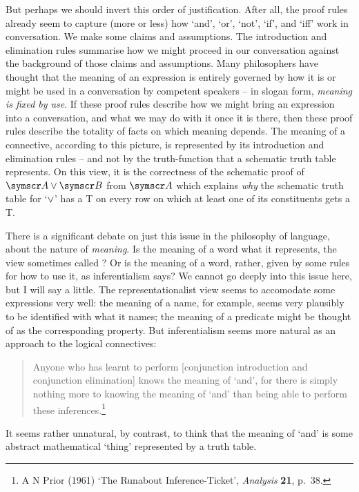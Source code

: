 But perhaps we should invert this order of justification. After all, the proof rules already seem to capture (more or less) how `and', `or', `not', `if', and `iff' work in conversation. We make some claims and assumptions. The introduction and elimination rules summarise how we might proceed in our conversation against the background of those claims and assumptions. Many philosophers have thought that the meaning of an expression is entirely governed by how it is or might be used in a conversation by competent speakers – in slogan form, \emph{meaning is fixed by use}. If these proof rules describe how we might bring an expression into a conversation, and what we may do with it once it is there, then these proof rules describe the totality of facts on which meaning depends. The meaning of a connective, according to this  picture, is represented by its introduction and elimination rules – and not by the truth-function that a schematic truth table represents. On this view, it is the correctness of the schematic proof of $\meta{A}\eor\meta{B}$ from $\meta{A}$ which explains \emph{why} the schematic truth table for `$\vee$' has a T on every row on which at least one of its constituents gets a T. 

There is a significant debate on just this issue in the philosophy of language, about the nature of \emph{meaning}. Is the meaning of a word what it represents, the view sometimes called ? Or is the meaning of a word, rather, given by some rules for how to use it, as inferentialism says? We cannot go deeply into this issue here, but I will say a little. The representationalist view seems to accomodate some expressions very well: the meaning of a name, for example, seems very plausibly to be identified with what it names; the meaning of a predicate might be thought of as the corresponding property. But inferentialism seems more natural as an approach to the logical connectives: 
\begin{quote}
	Anyone who has learnt to perform [conjunction introduction and conjunction elimination] knows the meaning of ‘and’, for there is simply nothing more to knowing the meaning of ‘and’ than being able to perform these inferences.\footnote{A N Prior (1961) `The Runabout Inference-Ticket', \emph{Analysis} \textbf{21}, p.\ 38.}
\end{quote} It seems rather unnatural, by contrast, to think that the meaning of `and' is some abstract mathematical `thing' represented by a truth table.


